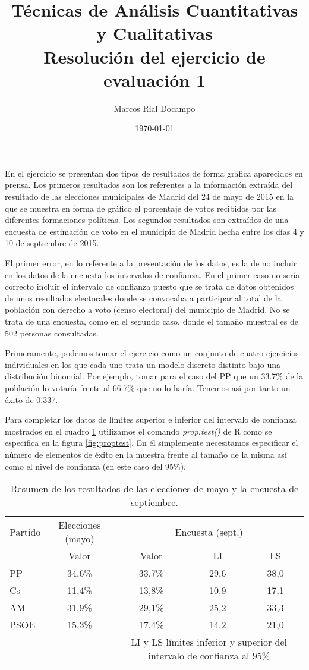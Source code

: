 \documentclass[11pt,a4paper]{article}
\author{Marcos Rial Docampo}
\title{Técnicas de Análisis Cuantitativas y Cualitativas\\Resolución del ejercicio de evaluación 1}
\date{\small{\today}}
\begin{document}
\maketitle

En el ejercicio se presentan dos tipos de resultados de forma gráfica aparecidos en prensa. Los primeros resultados son los referentes a la información extraída del resultado de las elecciones municipales de Madrid del 24 de mayo de 2015 en la que se muestra en forma de gráfico el porcentaje de votos recibidos por las diferentes formaciones políticas. Los segundos resultados son extraídos de una encuesta de estimación de voto en el municipio de Madrid hecha entre los días 4 y 10 de septiembre de 2015.

El primer error, en lo referente a la presentación de los datos, es la de no incluir en los datos de la encuesta los intervalos de confianza. En el primer caso no sería correcto incluir el intervalo de confianza puesto que se trata de datos obtenidos de unos resultados electorales donde se convocaba a participar al total de la población con derecho a voto (censo electoral) del municipio de Madrid. No se trata de una encuesta, como en el segundo caso, donde el tamaño muestral es de 502 personas consultadas.

Primeramente, podemos tomar el ejercicio como un conjunto de cuatro ejercicios individuales en los que cada uno trata un modelo discreto distinto bajo una distribución binomial. Por ejemplo, tomar para el caso del PP que un 33.7\% de la población lo votaría frente al 66.7\% que no lo haría. Tenemos así por tanto un éxito de 0.337.

Para completar los datos de límites superior e inferior del intervalo de confianza mostrados en el cuadro \ref{tab:resumen} utilizamos el comando \textit{prop.test()} de R como se especifica en la figura \ref{fig:proptest}. En él simplemente necesitamos especificar el número de elementos de éxito en la muestra frente al tamaño de la misma así como el nivel de confianza (en este caso del 95\%).

\begin{table}
	\centering
	\begin{tabular}{lcccc}
	\toprule[0.4mm]
	Partido & Elecciones (mayo) & \multicolumn{3}{c}{Encuesta (sept.)}\\
	& Valor & Valor & LI & LS \\
	\midrule
	PP & 34,6\% & 33,7\% & 29,6 & 38,0 \\
	Cs & 11,4\% & 13,8\% & 10,9 & 17,1 \\
	AM & 31,9\% & 29,1\% & 25,2 & 33,3 \\
	PSOE & 15,3\% & 17,4\% & 14,2 & 21,0 \\
	\bottomrule[0.4mm]
	& & \multicolumn{3}{p{3.4cm}}{\footnotesize{LI y LS límites inferior y superior del intervalo de confianza al 95\%}}
	\end{tabular}
	\caption{Resumen de los resultados de las elecciones de mayo y la encuesta de septiembre.}
\label{tab:resumen}
\end{table}
\end{document}
